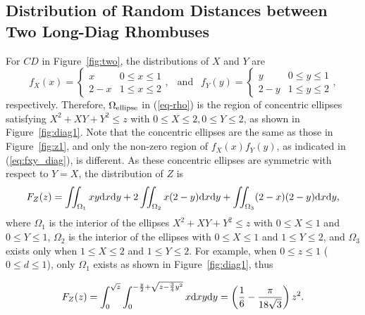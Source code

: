 \documentclass[12pt,draftclsnofoot,onecolumn]{IEEEtran}
\begin{document}
\subsection{Distribution of Random Distances between Two Long-Diag Rhombuses}

For $CD$ in Figure~\ref{fig:two}, the distributions of $X$ and $Y$ are
\begin{equation}\label{eq:fxy_diag}
  f_X(x)=\left\{
    \begin{array}{lr}
      x & 0\leq x \leq 1 \\
      2-x & 1 \leq x \leq 2
    \end{array}
  \right.,
  ~~\mbox{ and }~~ f_Y(y)=\left\{
    \begin{array}{lr}
      y & 0\leq y \leq 1 \\
      2-y & 1 \leq y \leq 2
    \end{array}
  \right.,
\end{equation}
respectively.
Therefore, $\Omega_{\rm ellipse}$ in (\ref{eq-rho}) is the
region of concentric ellipses satisfying $X^2+XY+Y^2 \leq z$ with $0 \leq X \leq 2, 0\leq Y \leq 2$,
as shown in Figure~\ref{fig:diag1}.
Note that the concentric ellipses are the same as those in Figure~\ref{fig:z1}, and only the non-zero
region of $f_X(x)f_Y(y)$, as indicated in (\ref{eq:fxy_diag}), is different.
As these concentric ellipses are symmetric with respect to $Y=X$, the distribution of $Z$ is
\begin{equation}\label{eq:fz_longdiag}
 F_Z(z)=\iint_{\Omega_1}xy{\rm d}x{\rm d}y+2\iint_{\Omega_2}x(2-y){\rm d}x{\rm
d}y+\iint_{\Omega_3}(2-x)(2-y){\rm d}x{\rm d}y,
\end{equation}
where $\Omega_1$ is the interior of the ellipses $X^2+XY+Y^2 \leq z$ with $0 \leq X
\leq 1$ and $0 \leq Y \leq 1$, $\Omega_2$ is the interior of the ellipses with
$0 \leq X \leq 1$ and $1 \leq Y \leq 2$, and $\Omega_3$ exists only when $1 \leq X \leq 2$
and $1 \leq Y \leq 2$.
For example, when $0\leq z \leq 1$ ($0\leq d \leq 1$), only $\Omega_1$
exists as shown in Figure~\ref{fig:diag1}, thus
\begin{small}
 \begin{equation}
 F_Z(z)=\int_0^{\sqrt{z}}\int_0^{-\frac{y}{2}+\sqrt{z-\frac{3}{4}y^2}}
x{\rm d}xy{\rm d}y=\left(\frac{1}{6}-\frac{\pi}{18\sqrt{3}}\right)z^2.
\end{equation}
\end{small}
\end{document}
